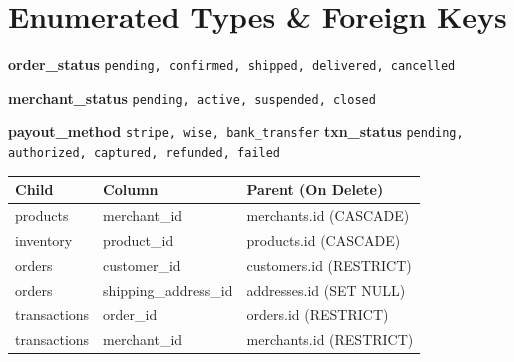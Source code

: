\section{Enumerated Types \& Foreign Keys}

\begin{minipage}{0.48\textwidth}
  \begin{tcolorbox}[colback=white,colframe=secondary!50,sharp corners,boxrule=0.3pt,
    left=2mm,right=2mm,top=1.5mm,bottom=1.5mm,before skip=0pt,after skip=1pt]
    {\fontsize{7}{9}\selectfont\color{primary}\textbf{order\_status} \textbar{} \texttt{pending, confirmed, shipped, delivered, cancelled}}
  \end{tcolorbox}
  \begin{tcolorbox}[colback=white,colframe=secondary!50,sharp corners,boxrule=0.3pt,
    left=2mm,right=2mm,top=1.5mm,bottom=1.5mm,before skip=0pt,after skip=1pt]
    {\fontsize{7}{9}\selectfont\color{primary}\textbf{merchant\_status} \textbar{} \texttt{pending, active, suspended, closed}}
  \end{tcolorbox}
  \begin{tcolorbox}[colback=white,colframe=secondary!50,sharp corners,boxrule=0.3pt,
    left=2mm,right=2mm,top=1.5mm,bottom=1.5mm,before skip=0pt,after skip=1pt]
    {\fontsize{7}{9}\selectfont\color{primary}\textbf{payout\_method} \textbar{} \texttt{stripe, wise, bank\_transfer} \hspace{1em} \textbf{txn\_status} \textbar{} \texttt{pending, authorized, captured, refunded, failed}}
  \end{tcolorbox}
\end{minipage}
\par
\begin{minipage}{0.48\textwidth}
  \begin{tcolorbox}[schemaframe]
    \renewcommand{\arraystretch}{1.1}
    \begin{tabularx}{\linewidth}{p{2.3cm} p{2.5cm} X}
      \toprule
      \rowcolor{primary!10}\textbf{Child} & \textbf{Column} & \textbf{Parent (On Delete)} \\
      \midrule
      products     & merchant\_id          & merchants.id (CASCADE) \\
      inventory    & product\_id           & products.id (CASCADE) \\
      orders       & customer\_id          & customers.id (RESTRICT) \\
      orders       & shipping\_address\_id & addresses.id (SET NULL) \\
      transactions & order\_id             & orders.id (RESTRICT) \\
      transactions & merchant\_id          & merchants.id (RESTRICT) \\
      \bottomrule
    \end{tabularx}
  \end{tcolorbox}
\end{minipage}
\par

